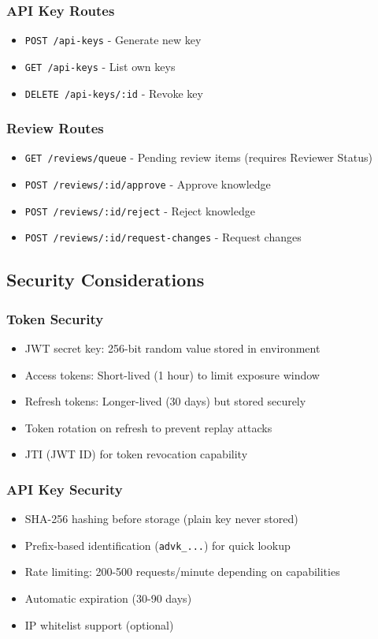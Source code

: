 \documentclass[12pt,a4paper]{article}
\begin{document}
\subsubsection{API Key Routes}
\begin{itemize}
    \item \texttt{POST /api-keys} - Generate new key
    \item \texttt{GET /api-keys} - List own keys
    \item \texttt{DELETE /api-keys/:id} - Revoke key
\end{itemize}

\subsubsection{Review Routes}
\begin{itemize}
    \item \texttt{GET /reviews/queue} - Pending review items (requires Reviewer Status)
    \item \texttt{POST /reviews/:id/approve} - Approve knowledge
    \item \texttt{POST /reviews/:id/reject} - Reject knowledge
    \item \texttt{POST /reviews/:id/request-changes} - Request changes
\end{itemize}

\subsection{Security Considerations}

\subsubsection{Token Security}
\begin{itemize}
    \item JWT secret key: 256-bit random value stored in environment
    \item Access tokens: Short-lived (1 hour) to limit exposure window
    \item Refresh tokens: Longer-lived (30 days) but stored securely
    \item Token rotation on refresh to prevent replay attacks
    \item JTI (JWT ID) for token revocation capability
\end{itemize}

\subsubsection{API Key Security}
\begin{itemize}
    \item SHA-256 hashing before storage (plain key never stored)
    \item Prefix-based identification (\texttt{advk\_...}) for quick lookup
    \item Rate limiting: 200-500 requests/minute depending on capabilities
    \item Automatic expiration (30-90 days)
    \item IP whitelist support (optional)
\end{itemize}
\end{document}
